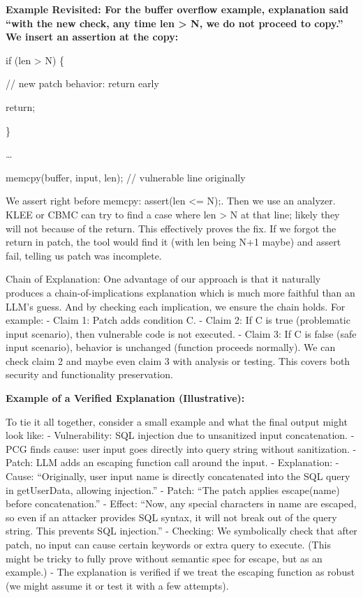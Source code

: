 \documentclass[conference,compsoc]{IEEEtran}
\begin{document}
\textbf{Example Revisited: For the buffer overflow example, explanation
said ``with the new check, any time len \textgreater{} N, we do not
proceed to copy.'' We insert an assertion at the copy:}

if (len \textgreater{} N) \{

// new patch behavior: return early

return;

\}

\ldots{}

memcpy(buffer, input, len); // vulnerable line originally

We assert right before memcpy: assert(len \textless= N);. Then we use an
analyzer. KLEE or CBMC can try to find a case where len \textgreater{} N
at that line; likely they will not because of the return. This
effectively proves the fix. If we forgot the return in patch, the tool
would find it (with len being N+1 maybe) and assert fail, telling us
patch was incomplete.

Chain of Explanation: One advantage of our approach is that it naturally
produces a chain-of-implications explanation which is much more faithful
than an LLM's guess. And by checking each implication, we ensure the
chain holds. For example: - Claim 1: Patch adds condition C. - Claim 2:
If C is true (problematic input scenario), then vulnerable code is not
executed. - Claim 3: If C is false (safe input scenario), behavior is
unchanged (function proceeds normally). We can check claim 2 and maybe
even claim 3 with analysis or testing. This covers both security and
functionality preservation.

\textbf{Example of a Verified Explanation (Illustrative):}

To tie it all together, consider a small example and what the final
output might look like: - Vulnerability: SQL injection due to
unsanitized input concatenation. - PCG finds cause: user input goes
directly into query string without sanitization. - Patch: LLM adds an
escaping function call around the input. - Explanation: - Cause:
``Originally, user input name is directly concatenated into the SQL
query in getUserData, allowing injection.'' - Patch: ``The patch applies
escape(name) before concatenation.'' - Effect: ``Now, any special
characters in name are escaped, so even if an attacker provides SQL
syntax, it will not break out of the query string. This prevents SQL
injection.'' - Checking: We symbolically check that after patch, no
input can cause certain keywords or extra query to execute. (This might
be tricky to fully prove without semantic spec for escape, but as an
example.) - The explanation is verified if we treat the escaping
function as robust (we might assume it or test it with a few attempts).
\end{document}

